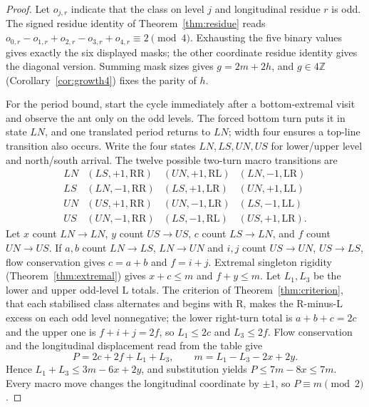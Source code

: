 \documentclass[11pt,reqno]{amsart}
\theoremstyle{plain}
\theoremstyle{definition}
\newcommand{\Z}{\mathbb{Z}}
\newcommand{\growth}{g}
\newcommand{\turnR}{\mathrm{R}}
\newcommand{\turnL}{\mathrm{L}}
\begin{document}
\begin{proof}
Let $o_{j,r}$ indicate that the class on level $j$ and longitudinal residue $r$ is
odd. The signed residue identity of Theorem~\ref{thm:residue} reads
$o_{0,r}-o_{1,r}+o_{2,r}-o_{3,r}+o_{4,r}\equiv2\pmod4$. Exhausting the five binary
values gives exactly the six displayed masks; the other coordinate residue identity
gives the diagonal version. Summing mask sizes gives $\growth=2m+2h$, and
$\growth\in4\Z$ (Corollary~\ref{cor:growth4}) fixes the parity of $h$.

For the period bound, start the cycle immediately after a bottom-extremal visit and
observe the ant only on the odd levels. The forced bottom turn puts it in state
$LN$, and one translated period returns to $LN$; width four ensures a top-line
transition also occurs. Write the four states $LN,LS,UN,US$ for lower/upper level and
north/south arrival. The twelve possible two-turn macro transitions are
\[
\begin{array}{c|ccc}
LN&(LS,+1,\mathrm{RR})&(UN,+1,\mathrm{RL})&(LN,-1,\mathrm{LR})\\
LS&(LN,-1,\mathrm{RR})&(LS,+1,\mathrm{LR})&(UN,+1,\mathrm{LL})\\
UN&(US,+1,\mathrm{RR})&(UN,-1,\mathrm{LR})&(LS,-1,\mathrm{LL})\\
US&(UN,-1,\mathrm{RR})&(LS,-1,\mathrm{RL})&(US,+1,\mathrm{LR}).
\end{array}
\]
Let $x$ count $LN\to LN$, $y$ count $US\to US$, $c$ count $LS\to LN$, and $f$ count
$UN\to US$. If $a,b$ count $LN\to LS$, $LN\to UN$ and $i,j$ count $US\to UN$,
$US\to LS$, flow conservation gives $c=a+b$ and $f=i+j$. Extremal singleton rigidity
(Theorem~\ref{thm:extremal}) gives $x+c\le m$ and $f+y\le m$. Let $L_1,L_3$ be the
lower and upper odd-level $\turnL$ totals. The criterion of
Theorem~\ref{thm:criterion}, that each stabilised class alternates and begins with
$\turnR$, makes the $\turnR$-minus-$\turnL$ excess on each odd level nonnegative; the
lower right-turn total is $a+b+c=2c$ and the upper one is $f+i+j=2f$, so $L_1\le2c$
and $L_3\le2f$. Flow conservation and the longitudinal displacement read from the
table give
\[
P=2c+2f+L_1+L_3,\qquad m=L_1-L_3-2x+2y.
\]
Hence $L_1+L_3\le3m-6x+2y$, and substitution yields $P\le7m-8x\le7m$. Every macro
move changes the longitudinal coordinate by $\pm1$, so $P\equiv m\pmod2$.
\end{proof}
\end{document}
